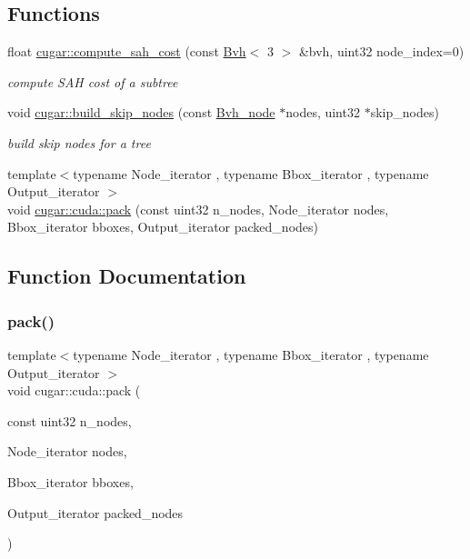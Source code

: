 \subsection*{Functions}
\begin{DoxyCompactItemize}
\item 
\mbox{\label{group__bvh_ga3f50a853dcace7bd0d1a8503f0ef00fe}} 
float \hyperlink{group__bvh_ga3f50a853dcace7bd0d1a8503f0ef00fe}{cugar\+::compute\+\_\+sah\+\_\+cost} (const \hyperlink{structcugar_1_1_bvh}{Bvh}$<$ 3 $>$ \&bvh, uint32 node\+\_\+index=0)
\begin{DoxyCompactList}\small\item\em compute S\+AH cost of a subtree \end{DoxyCompactList}\item 
\mbox{\label{group__bvh_ga0b0f275e25ece0b073a2b866a31cf9e2}} 
void \hyperlink{group__bvh_ga0b0f275e25ece0b073a2b866a31cf9e2}{cugar\+::build\+\_\+skip\+\_\+nodes} (const \hyperlink{structcugar_1_1_bvh__node}{Bvh\+\_\+node} $\ast$nodes, uint32 $\ast$skip\+\_\+nodes)
\begin{DoxyCompactList}\small\item\em build skip nodes for a tree \end{DoxyCompactList}\item 
{\footnotesize template$<$typename Node\+\_\+iterator , typename Bbox\+\_\+iterator , typename Output\+\_\+iterator $>$ }\\void \hyperlink{group__bvh_ga5cb2a6a87d661a3ffe43c31ab025b9fa}{cugar\+::cuda\+::pack} (const uint32 n\+\_\+nodes, Node\+\_\+iterator nodes, Bbox\+\_\+iterator bboxes, Output\+\_\+iterator packed\+\_\+nodes)
\end{DoxyCompactItemize}


\subsection{Function Documentation}
\mbox{\label{group__bvh_ga5cb2a6a87d661a3ffe43c31ab025b9fa}} 
\subsubsection{\texorpdfstring{pack()}{pack()}}
{\footnotesize\ttfamily template$<$typename Node\+\_\+iterator , typename Bbox\+\_\+iterator , typename Output\+\_\+iterator $>$ \\
void cugar\+::cuda\+::pack (\begin{DoxyParamCaption}\item[{const uint32}]{n\+\_\+nodes,  }\item[{Node\+\_\+iterator}]{nodes,  }\item[{Bbox\+\_\+iterator}]{bboxes,  }\item[{Output\+\_\+iterator}]{packed\+\_\+nodes }\end{DoxyParamCaption})}

